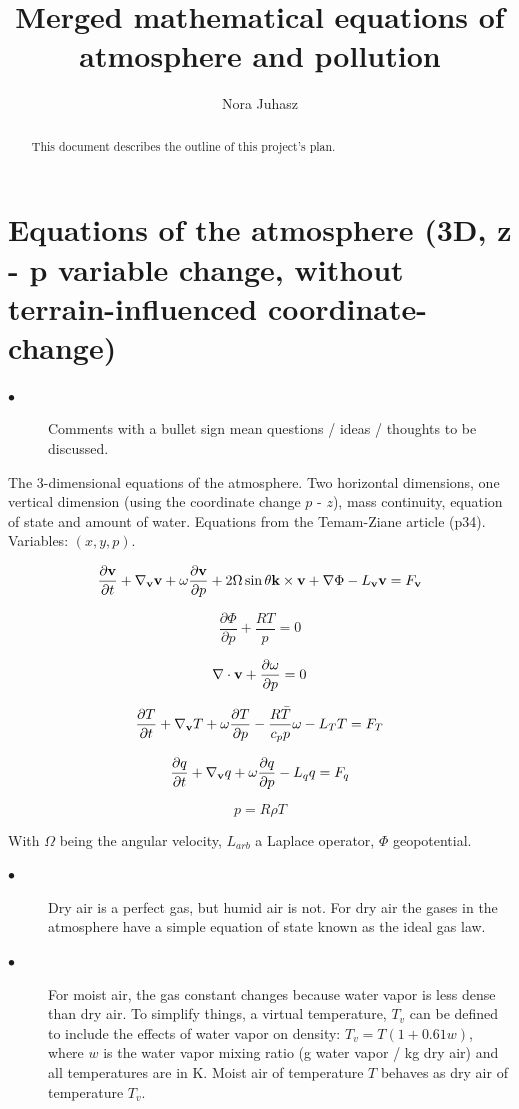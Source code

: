 \documentclass{article}
\title{Merged mathematical equations of atmosphere and pollution}
\author{Nora Juhasz}
\begin{document}
\maketitle
\newpage

\begin{abstract}

This document describes the outline of this project's plan.\\

\end{abstract}
\newpage

\tableofcontents
\newpage

\section{Equations of the atmosphere (3D, z - p variable change, without terrain-influenced coordinate-change)}

\begin{description}
  \item[$\bullet$] Comments with a bullet sign mean questions / ideas / thoughts to be discussed.
\end{description}

The 3-dimensional equations of the atmosphere. Two horizontal dimensions, one vertical dimension (using the coordinate change $p$ - $z$), mass continuity, equation of state and amount of water. Equations from the Temam-Ziane article (p34). Variables: $(x,y,p)$.

\[ \frac{\partial \bold{v}}{\partial t} + \nabla_{\bold{v}}\bold{v} + \omega \frac{\partial \bold{v}}{\partial p} + 2 \Omega \sin \theta \bold{k} \times \bold{v} + \nabla \Phi -L_{\bold{v}} \bold{v} = F_\bold{v}  \]

\[ \frac{\partial \Phi}{\partial p} + \frac{RT}{p} = 0 \]

\[ \nabla \cdot \bold{v} + \frac{\partial \omega}{\partial p} = 0\]

\[ \frac{\partial T}{\partial t} + \nabla_{\bold{v}} T + \omega \frac{\partial T}{\partial p} - \frac{R \bar{T}}{c_p p} \omega - L_T T = F_T\]

\[ \frac{\partial q}{\partial t} + \nabla_{\bold{v}}q + \omega \frac{\partial q}{\partial p} -L_q q = F_q \]

\[ p = R \rho T\]

With $\Omega$ being the angular velocity, $L_{arb}$ a Laplace operator, $\Phi$ geopotential.

\begin{description}
  \item[$\bullet$] Dry air is a perfect gas, but humid air is not. For dry air the gases in the atmosphere have a simple equation of state known as the ideal gas law.
  \item[$\bullet$] For moist air, the gas constant changes because water vapor is less dense than dry air. To simplify things, a virtual temperature, $T_v$ can be defined to include the effects of water vapor on density: $T_v = T (1 + 0.61 w) $, where $w$ is the water vapor mixing ratio (g water vapor / kg dry air) and all temperatures are in K.  Moist air of temperature $T$ behaves as dry air of temperature $T_v$.
\end{description}
\end{document}
